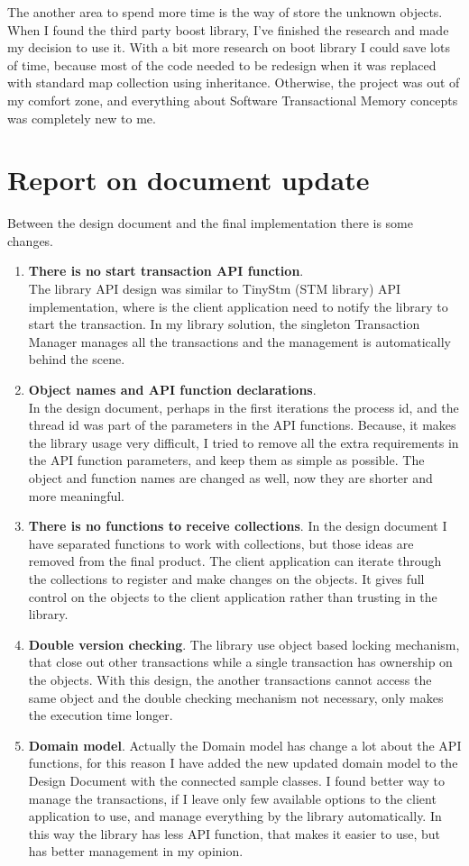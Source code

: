 \documentclass[12pt]{article}
\begin{document}
The another area to spend more time is the way of store the unknown objects. When I found the third party boost library, I've finished the research and made my decision to use it. With a bit more research on boot library I could save lots of time, because most of the code needed to be redesign when it was replaced with standard map collection using inheritance. Otherwise, the project was out of my comfort zone, and everything about Software Transactional Memory concepts was completely new to me.\\

\section{Report on document update}
Between the design document and the final implementation there is some changes.
\begin{enumerate}
\item \textbf{There is no start transaction API function}.\\
The library API design was similar to TinyStm (STM library) API implementation, where is the client application need to notify the library to start the transaction. In my library solution, the singleton Transaction Manager manages all the transactions and the management is automatically behind the scene.  
\item \textbf{Object names and API function declarations}.\\
In the design document, perhaps in the first iterations the process id, and the thread id was part of the parameters in the API functions. Because, it makes the library usage very difficult, I tried to remove all the extra requirements in the API function parameters, and keep them as simple as possible. The object and function names are changed as well, now they are shorter and more meaningful.
\item \textbf{There is no functions to receive collections}.
In the design document I have separated functions to work with collections, but those ideas are removed from the final product. The client application can iterate through the collections to register and make changes on the objects. It gives full control on the objects to the client application rather than trusting in the library.
\item \textbf{Double version checking}.
The library use object based locking mechanism, that close out other transactions while a single transaction has ownership on the objects. With this design, the another transactions cannot access the same object and the double checking mechanism not necessary, only makes the execution time longer.
\item \textbf{Domain model}.
Actually the Domain model has change a lot about the API functions, for this reason I have added the new updated domain model to the Design Document with the connected sample classes. I found better way to manage the transactions, if I leave only few available options to the client application to use, and manage everything by the library automatically. In this way the library has less API function, that makes it easier to use, but has better management in my opinion. 
\end{enumerate}
\end{document}
